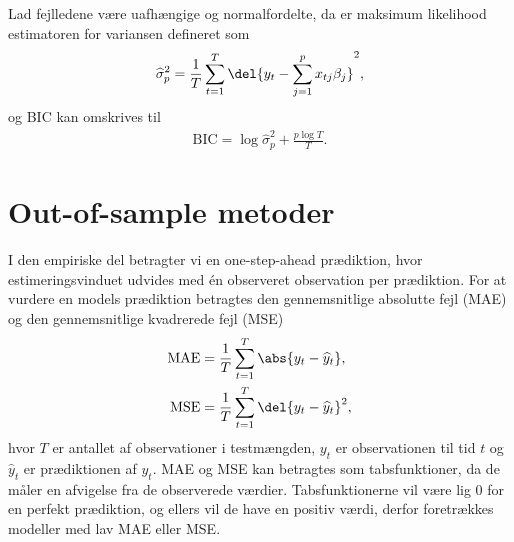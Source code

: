 Lad fejlledene være uafhængige og normalfordelte, da er maksimum likelihood estimatoren for variansen defineret som
\begin{align*}
\widehat{\sigma}_p^2 = \frac{1}{T} \sum_{t=1}^{T} \del{y_t - \sum_{j=1}^p x_{tj}\beta_j}^2,
\end{align*}
og BIC kan omskrives til
\begin{align*}
\text{BIC} = \log \widehat{\sigma}^2_p + \frac{p \log T}{T}.
\end{align*}

\section{Out-of-sample metoder}
I den empiriske del betragter vi en one-step-ahead prædiktion, hvor estimeringsvinduet udvides med én observeret observation per prædiktion.
For at vurdere en models prædiktion betragtes den gennemsnitlige absolutte fejl (MAE) og den gennemsnitlige kvadrerede fejl (MSE)
\begin{align}
\text{MAE} & =  \frac{1}{T} \sum_{t=1}^{T} \abs{y_{t} - \widehat{y}_{t}} \label{eq:mae} , \\
\text{MSE} & =  \frac{1}{T} \sum_{t=1}^{T} \del{y_{t} - \widehat{y}_{t}}^2 \label{eq:mse},
\end{align} 
hvor $T$ er antallet af observationer i testmængden, $y_{t}$ er observationen til tid $t$ og $\widehat{y}_{t}$ er prædiktionen af $y_{t}$.
MAE og MSE kan betragtes som tabsfunktioner, da de måler en afvigelse fra de observerede værdier.
Tabsfunktionerne vil være lig 0 for en perfekt prædiktion, og ellers vil de have en positiv værdi, derfor foretrækkes modeller med lav MAE eller MSE.

